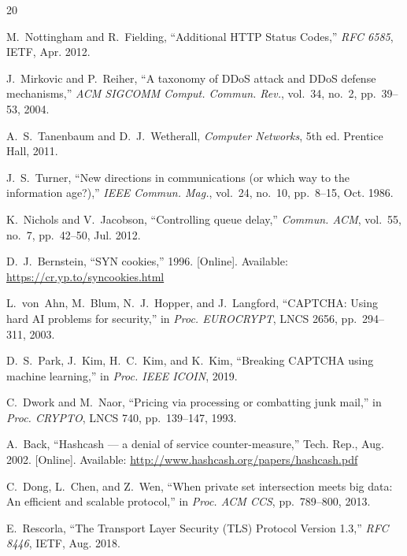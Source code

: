 \documentclass[10pt,conference]{IEEEtran}
\begin{document}

\begin{thebibliography}{20}

M.~Nottingham and R.~Fielding,
``Additional HTTP Status Codes,''
\textit{RFC 6585}, IETF, Apr. 2012.

J.~Mirkovic and P.~Reiher,
``A taxonomy of DDoS attack and DDoS defense mechanisms,''
\textit{ACM SIGCOMM Comput. Commun. Rev.}, vol.~34, no.~2,
pp.~39--53, 2004.

A.~S.~Tanenbaum and D.~J.~Wetherall,
\textit{Computer Networks}, 5th ed.
Prentice Hall, 2011.

J.~S.~Turner,
``New directions in communications (or which way to the information age?),''
\textit{IEEE Commun. Mag.}, vol.~24, no.~10, pp.~8--15, Oct. 1986.

K.~Nichols and V.~Jacobson,
``Controlling queue delay,''
\textit{Commun. ACM}, vol.~55, no.~7, pp.~42--50, Jul. 2012.

D.~J.~Bernstein,
``SYN cookies,'' 1996.
[Online]. Available: \url{https://cr.yp.to/syncookies.html}

L.~von~Ahn, M.~Blum, N.~J.~Hopper, and J.~Langford,
``CAPTCHA: Using hard AI problems for security,''
in \textit{Proc. EUROCRYPT}, LNCS 2656, pp.~294--311, 2003.

D.~S.~Park, J.~Kim, H.~C.~Kim, and K.~Kim,
``Breaking CAPTCHA using machine learning,''
in \textit{Proc. IEEE ICOIN}, 2019.

C.~Dwork and M.~Naor,
``Pricing via processing or combatting junk mail,''
in \textit{Proc. CRYPTO}, LNCS 740, pp.~139--147, 1993.

A.~Back,
``Hashcash --- a denial of service counter-measure,''
Tech. Rep., Aug. 2002.
[Online]. Available: \url{http://www.hashcash.org/papers/hashcash.pdf}

C.~Dong, L.~Chen, and Z.~Wen,
``When private set intersection meets big data: An efficient and scalable
protocol,''
in \textit{Proc. ACM CCS}, pp.~789--800, 2013.

E.~Rescorla,
``The Transport Layer Security (TLS) Protocol Version 1.3,''
\textit{RFC 8446}, IETF, Aug. 2018.


\end{thebibliography}
\end{document}
